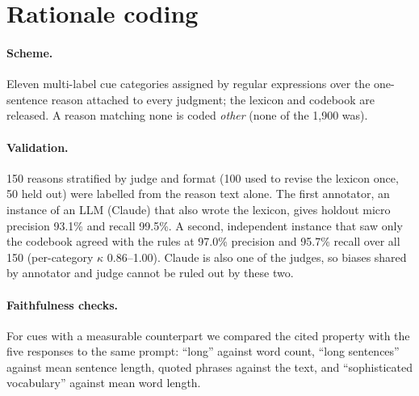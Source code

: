 \section{Rationale coding}
\label{app:rationales}

\paragraph{Scheme.} Eleven multi-label cue categories assigned by regular
expressions over the one-sentence reason attached to every judgment; the
lexicon and codebook are released. A reason matching none is coded
\emph{other} (none of the 1,900 was).

\paragraph{Validation.} 150 reasons stratified by judge and format (100 used
to revise the lexicon once, 50 held out) were labelled from the reason text
alone. The first annotator, an instance of an LLM (Claude) that also wrote
the lexicon, gives holdout micro precision 93.1\% and recall 99.5\%. A
second, independent instance that saw only the codebook agreed with the
rules at 97.0\% precision and 95.7\% recall over all 150 (per-category
$\kappa$ 0.86--1.00). Claude is also one of the judges, so biases shared by
annotator and judge cannot be ruled out by these two. \RationaleHumanAppendix{}

\paragraph{Faithfulness checks.} For cues with a measurable counterpart we
compared the cited property with the five responses to the same prompt:
``long'' against word count, ``long sentences'' against mean sentence
length, quoted phrases against the text, and ``sophisticated vocabulary''
against mean word length.
